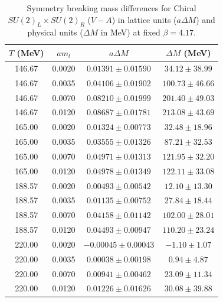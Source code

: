 \begin{table}[H]
\centering
\renewcommand{\arraystretch}{1.2}
\caption{Symmetry breaking mass differences for Chiral $SU(2)_L \times SU(2)_R$ ($V-A$) in lattice units ($a\Delta M$) and physical units ($\Delta M$ in MeV) at fixed $\beta=4.17$.}
\label{tab:su2_l_su2_r_asym_data}
\begin{tabular}{cccc}
\hline\hline
$T$ (MeV) & $am_l$ & $a\Delta M$ & $\Delta M$ (MeV) \\
\hline
146.67 & 0.0020 & $0.01391 \pm 0.01590$ & $34.12 \pm 38.99$ \\
146.67 & 0.0035 & $0.04106 \pm 0.01902$ & $100.73 \pm 46.66$ \\
146.67 & 0.0070 & $0.08210 \pm 0.01999$ & $201.40 \pm 49.03$ \\
146.67 & 0.0120 & $0.08687 \pm 0.01781$ & $213.08 \pm 43.69$ \\
\hline
165.00 & 0.0020 & $0.01324 \pm 0.00773$ & $32.48 \pm 18.96$ \\
165.00 & 0.0035 & $0.03555 \pm 0.01326$ & $87.21 \pm 32.53$ \\
165.00 & 0.0070 & $0.04971 \pm 0.01313$ & $121.95 \pm 32.20$ \\
165.00 & 0.0120 & $0.04978 \pm 0.01349$ & $122.11 \pm 33.08$ \\
\hline
188.57 & 0.0020 & $0.00493 \pm 0.00542$ & $12.10 \pm 13.30$ \\
188.57 & 0.0035 & $0.01135 \pm 0.00752$ & $27.84 \pm 18.44$ \\
188.57 & 0.0070 & $0.04158 \pm 0.01142$ & $102.00 \pm 28.01$ \\
188.57 & 0.0120 & $0.04493 \pm 0.00947$ & $110.20 \pm 23.24$ \\
\hline
220.00 & 0.0020 & $-0.00045 \pm 0.00043$ & $-1.10 \pm 1.07$ \\
220.00 & 0.0035 & $0.00038 \pm 0.00198$ & $0.94 \pm 4.87$ \\
220.00 & 0.0070 & $0.00941 \pm 0.00462$ & $23.09 \pm 11.34$ \\
220.00 & 0.0120 & $0.01226 \pm 0.01626$ & $30.08 \pm 39.88$ \\
\hline\hline
\end{tabular}
\end{table}

